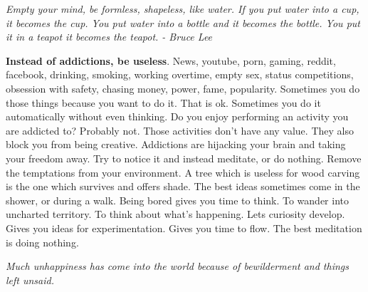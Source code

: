 \documentclass[a4paper,hidelinks]{article}
\begin{document}
\newpage

\begin{center}
\textit{Empty your mind, be formless, shapeless, like water. If you put water into a cup, it becomes the cup. You put water into a bottle and it becomes the bottle. You put it in a teapot it becomes the teapot. - Bruce Lee}
\end{center}

\textbf{Instead of addictions, be useless}.
News, youtube, porn, gaming, reddit, facebook, drinking, smoking, working overtime, empty sex, status competitions, obsession with safety, chasing money, power, fame, popularity.
Sometimes you do those things because you want to do it.
That is ok.
Sometimes you do it automatically without even thinking.
Do you enjoy performing an activity you are addicted to?
Probably not.
Those activities don't have any value.
They also block you from being creative.
Addictions are hijacking your brain and taking your freedom away.
Try to notice it and instead meditate, or do nothing.
Remove the temptations from your environment.
A tree which is useless for wood carving is the one which survives and offers shade.
The best ideas sometimes come in the shower, or during a walk.
Being bored gives you time to think.
To wander into uncharted territory.
To think about what's happening.
Lets curiosity develop.
Gives you ideas for experimentation.
Gives you time to flow.
The best meditation is doing nothing.

\newpage

\begin{center}
\textit{Much unhappiness has come into the world because of bewilderment and things left unsaid.}
\end{center}
\end{document}
